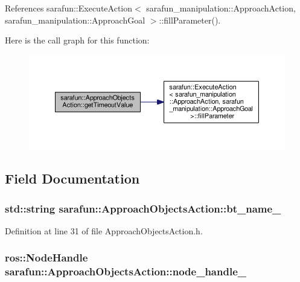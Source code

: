 References sarafun\-::\-Execute\-Action$<$ sarafun\-\_\-manipulation\-::\-Approach\-Action, sarafun\-\_\-manipulation\-::\-Approach\-Goal $>$\-::fill\-Parameter().



Here is the call graph for this function\-:
\nopagebreak
\begin{figure}[H]
\begin{center}
\leavevmode
\includegraphics[width=350pt]{d6/db4/classsarafun_1_1ApproachObjectsAction_a6852994a6e8a1edf9b2c24c91fd07df2_a6852994a6e8a1edf9b2c24c91fd07df2_cgraph}
\end{center}
\end{figure}




\subsection{Field Documentation}
\hypertarget{classsarafun_1_1ApproachObjectsAction_ad56b6e84045b8e8156c9dcd1032f9e4e_ad56b6e84045b8e8156c9dcd1032f9e4e}{
\subsubsection[{bt\-\_\-name\-\_\-}]{\setlength{\rightskip}{0pt plus 5cm}std\-::string sarafun\-::\-Approach\-Objects\-Action\-::bt\-\_\-name\-\_\-\hspace{0.3cm}{\ttfamily [private]}}}\label{classsarafun_1_1ApproachObjectsAction_ad56b6e84045b8e8156c9dcd1032f9e4e_ad56b6e84045b8e8156c9dcd1032f9e4e}


Definition at line 31 of file Approach\-Objects\-Action.\-h.

\hypertarget{classsarafun_1_1ApproachObjectsAction_a34be70606c892761861b9d25d870a4fb_a34be70606c892761861b9d25d870a4fb}{
\subsubsection[{node\-\_\-handle\-\_\-}]{\setlength{\rightskip}{0pt plus 5cm}ros\-::\-Node\-Handle sarafun\-::\-Approach\-Objects\-Action\-::node\-\_\-handle\-\_\-\hspace{0.3cm}{\ttfamily [private]}}}\label{classsarafun_1_1ApproachObjectsAction_a34be70606c892761861b9d25d870a4fb_a34be70606c892761861b9d25d870a4fb}



